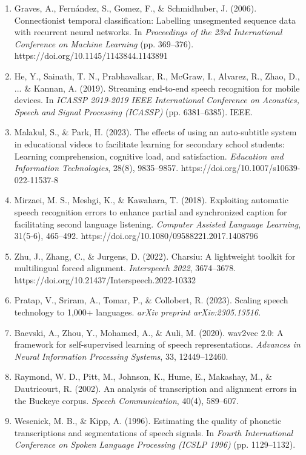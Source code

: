 \documentclass[12pt,a4paper]{article}
\begin{document}
\begin{enumerate}
    \item Graves, A., Fern\'andez, S., Gomez, F., \& Schmidhuber, J. (2006). Connectionist temporal classification: Labelling unsegmented sequence data with recurrent neural networks. In \textit{Proceedings of the 23rd International Conference on Machine Learning} (pp. 369--376). https://doi.org/10.1145/1143844.1143891
    \item He, Y., Sainath, T. N., Prabhavalkar, R., McGraw, I., Alvarez, R., Zhao, D., ... \& Kannan, A. (2019). Streaming end-to-end speech recognition for mobile devices. In \textit{ICASSP 2019-2019 IEEE International Conference on Acoustics, Speech and Signal Processing (ICASSP)} (pp. 6381--6385). IEEE.
    \item Malakul, S., \& Park, H. (2023). The effects of using an auto-subtitle system in educational videos to facilitate learning for secondary school students: Learning comprehension, cognitive load, and satisfaction. \textit{Education and Information Technologies}, 28(8), 9835--9857. https://doi.org/10.1007/s10639-022-11537-8
    \item Mirzaei, M. S., Meshgi, K., \& Kawahara, T. (2018). Exploiting automatic speech recognition errors to enhance partial and synchronized caption for facilitating second language listening. \textit{Computer Assisted Language Learning}, 31(5-6), 465--492. https://doi.org/10.1080/09588221.2017.1408796
    \item Zhu, J., Zhang, C., \& Jurgens, D. (2022). Charsiu: A lightweight toolkit for multilingual forced alignment. \textit{Interspeech 2022}, 3674--3678. https://doi.org/10.21437/Interspeech.2022-10332
    \item Pratap, V., Sriram, A., Tomar, P., \& Collobert, R. (2023). Scaling speech technology to 1,000+ languages. \textit{arXiv preprint arXiv:2305.13516}.
    \item Baevski, A., Zhou, Y., Mohamed, A., \& Auli, M. (2020). wav2vec 2.0: A framework for self-supervised learning of speech representations. \textit{Advances in Neural Information Processing Systems}, 33, 12449--12460.
    \item Raymond, W. D., Pitt, M., Johnson, K., Hume, E., Makashay, M., \& Dautricourt, R. (2002). An analysis of transcription and alignment errors in the Buckeye corpus. \textit{Speech Communication}, 40(4), 589--607.
    \item Wesenick, M. B., \& Kipp, A. (1996). Estimating the quality of phonetic transcriptions and segmentations of speech signals. In \textit{Fourth International Conference on Spoken Language Processing (ICSLP 1996)} (pp. 1129--1132).

\end{enumerate}
\end{document}
